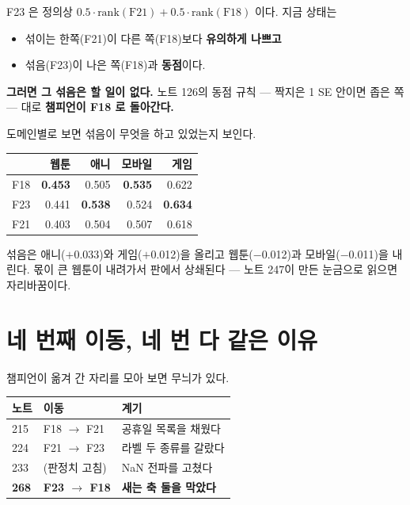 \documentclass[10pt]{article}
\begin{document}
F23 은 정의상 $0.5 \cdot \text{rank}(\text{F21}) + 0.5 \cdot
\text{rank}(\text{F18})$ 이다. 지금 상태는

\begin{itemize}
\item 섞이는 한쪽(F21)이 다른 쪽(F18)보다 \textbf{유의하게 나쁘고}
\item 섞음(F23)이 나은 쪽(F18)과 \textbf{동점}이다.
\end{itemize}

\textbf{그러면 그 섞음은 할 일이 없다.} 노트 126의 동점 규칙 --- 짝지은
1 SE 안이면 좁은 쪽 --- 대로 \textbf{챔피언이 F18 로 돌아간다.}

도메인별로 보면 섞음이 무엇을 하고 있었는지 보인다.

\begin{center}\small
\begin{tabular}{lrrrr}
\hline
 & 웹툰 & 애니 & 모바일 & 게임 \\
\hline
F18 & \textbf{0.453} & 0.505 & \textbf{0.535} & 0.622 \\
F23 & 0.441 & \textbf{0.538} & 0.524 & \textbf{0.634} \\
F21 & 0.403 & 0.504 & 0.507 & 0.618 \\
\hline
\end{tabular}
\end{center}

섞음은 애니($+$0.033)와 게임($+$0.012)을 올리고 웹툰($-$0.012)과
모바일($-$0.011)을 내린다. 몫이 큰 웹툰이 내려가서 판에서 상쇄된다 ---
노트 247이 만든 눈금으로 읽으면 자리바꿈이다.

\section{네 번째 이동, 네 번 다 같은 이유}

챔피언이 옮겨 간 자리를 모아 보면 무늬가 있다.

\begin{center}\small
\begin{tabular}{lll}
\hline
노트 & 이동 & 계기 \\
\hline
215 & F18 $\to$ F21 & 공휴일 목록을 채웠다 \\
224 & F21 $\to$ F23 & 라벨 두 종류를 갈랐다 \\
233 & (판정치 고침) & NaN 전파를 고쳤다 \\
\textbf{268} & \textbf{F23 $\to$ F18} & \textbf{새는 축 둘을 막았다} \\
\hline
\end{tabular}
\end{center}
\end{document}
